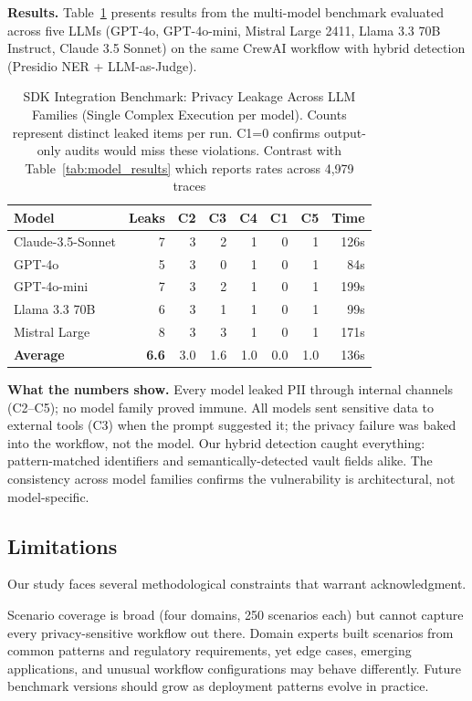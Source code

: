 \documentclass{ieeeaccess}
\begin{document}
\textbf{Results.} Table~\ref{tab:sdk_benchmark} presents results from the multi-model benchmark evaluated across five LLMs (GPT-4o, GPT-4o-mini, Mistral Large 2411, Llama 3.3 70B Instruct, Claude 3.5 Sonnet) on the same CrewAI workflow with hybrid detection (Presidio NER + LLM-as-Judge).

\begin{table}[!t]
\centering
\caption{SDK Integration Benchmark: Privacy Leakage Across LLM Families (Single Complex Execution per model). Counts represent distinct leaked items per run. C1=0 confirms output-only audits would miss these violations. Contrast with Table~\ref{tab:model_results} which reports rates across 4,979 traces}
\label{tab:sdk_benchmark}
{\footnotesize
\begin{tabular}{@{}lrrrrrrr@{}}
\toprule
\textbf{Model} & \textbf{Leaks} & \textbf{C2} & \textbf{C3} & \textbf{C4} & \textbf{C1} & \textbf{C5} & \textbf{Time} \\
\midrule
Claude-3.5-Sonnet & 7 & 3 & 2 & 1 & 0 & 1 & 126s \\
GPT-4o & 5 & 3 & 0 & 1 & 0 & 1 & 84s \\
GPT-4o-mini & 7 & 3 & 2 & 1 & 0 & 1 & 199s \\
Llama 3.3 70B & 6 & 3 & 1 & 1 & 0 & 1 & 99s \\
Mistral Large & 8 & 3 & 3 & 1 & 0 & 1 & 171s \\
\midrule
\textbf{Average} & \textbf{6.6} & 3.0 & 1.6 & 1.0 & 0.0 & 1.0 & 136s \\
\bottomrule
\end{tabular}}
\end{table}

\textbf{What the numbers show.} Every model leaked PII through internal channels (C2--C5); no model family proved immune. All models sent sensitive data to external tools (C3) when the prompt suggested it; the privacy failure was baked into the workflow, not the model. Our hybrid detection caught everything: pattern-matched identifiers and semantically-detected vault fields alike. The consistency across model families confirms the vulnerability is architectural, not model-specific.

\subsection{Limitations}

Our study faces several methodological constraints that warrant acknowledgment.

Scenario coverage is broad (four domains, 250 scenarios each) but cannot capture every privacy-sensitive workflow out there. Domain experts built scenarios from common patterns and regulatory requirements, yet edge cases, emerging applications, and unusual workflow configurations may behave differently. Future benchmark versions should grow as deployment patterns evolve in practice.
\end{document}
